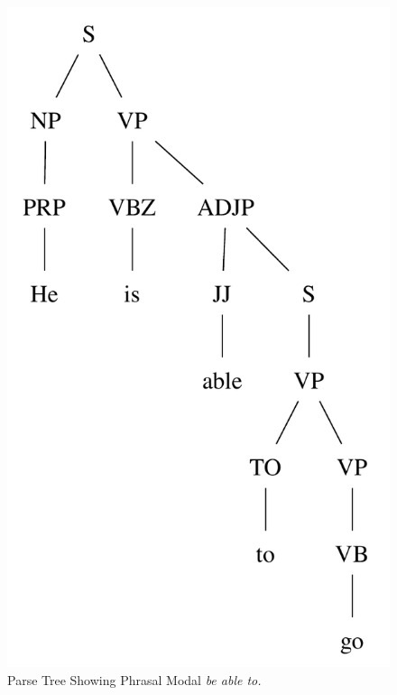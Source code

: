 \documentclass[main.tex]{subfiles}
\begin{document}
\begin{figure}[htbp]
\centering
\includegraphics[scale=0.6]{modal-able.pdf}
\caption{Parse Tree Showing Phrasal Modal \textit{be able to.}}
\label{fig:quasimodal-able}
\end{figure}
\end{document}
